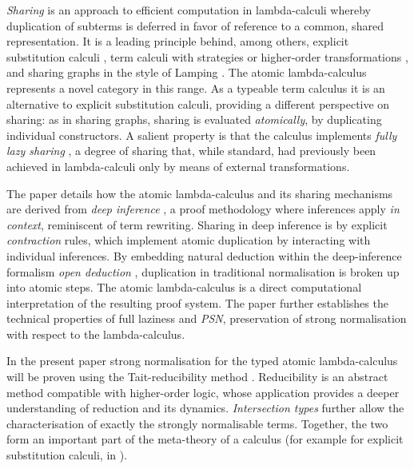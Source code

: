 \documentclass[orivec]{llncs}
\begin{document}
\emph{Sharing} is an approach to efficient computation in lambda-calculi whereby duplication of subterms is deferred in favor of reference to a common, shared representation.
%
It is a leading principle behind, among others, explicit substitution calculi \cite{Abadi-Cardelli-Curien-Levy-1991,Lescanne-1994,David-Guillaume-2001,DiCosmo-Kesner-Polonovski-2003,Kesner-Lengrand-2007,Accattoli-Kesner-2010}, term calculi with strategies or higher-order transformations \cite{Hughes-1982,Ariola-Felleisen-Maraist-Odersky-Wadler-1995}, and sharing graphs in the style of Lamping \cite{Lamping-1990,Asperti-Guerrini-1998,VanOostrom-VanDeLooij-Zwitserlood-2004}.
%
The atomic lambda-calculus represents a novel category in this range.
%
As a typeable term calculus it is an alternative to explicit substitution calculi, providing a different perspective on sharing: as in sharing graphs, sharing is evaluated \emph{atomically}, by duplicating individual constructors.
%
A salient property is that the calculus implements \emph{fully lazy sharing} \cite{Wadsworth-1971,Hughes-1982,Balabonski-2012}, a degree of sharing that, while standard, had previously been achieved in lambda-calculi only by means of external transformations.



The paper \cite{Gundersen-Heijltjes-Parigot-2013-LICS} details how the atomic lambda-calculus and its sharing mechanisms are derived from \emph{deep inference} \cite{}, a proof methodology where inferences apply \emph{in context}, reminiscent of term rewriting.
%
Sharing in deep inference is by explicit \emph{contraction} rules, which implement atomic duplication by interacting with individual inferences.
%
By embedding natural deduction within the deep-inference formalism \emph{open deduction} \cite{Guglielmi-Gundersen-Parigot-2010}, duplication in traditional normalisation is broken up into atomic steps.
%
The atomic lambda-calculus is a direct computational interpretation of the resulting proof system.
%
The paper \cite{Gundersen-Heijltjes-Parigot-2013-LICS} further establishes the technical properties of full laziness and \emph{PSN}, preservation of strong normalisation with respect to the lambda-calculus.



In the present paper strong normalisation for the typed atomic lambda-calculus will be proven using the Tait-reducibility method \cite{Tait-1967,ProofsAndTypes}.
%
Reducibility is an abstract method compatible with higher-order logic, whose application provides a deeper understanding of reduction and its dynamics.
%
\emph{Intersection types} \cite{Coppo-DezaniCiancaglini-1980,Pottinger-1980,Krivine-1993} further allow the characterisation of exactly the strongly normalisable terms.
%
Together, the two form an important part of the meta-theory of a calculus (for example for explicit substitution calculi, in \cite{Dougherty-Lescanne-2001,Ghilezan-Ivetic-Lescanne-Likavec-2011}).
\end{document}
